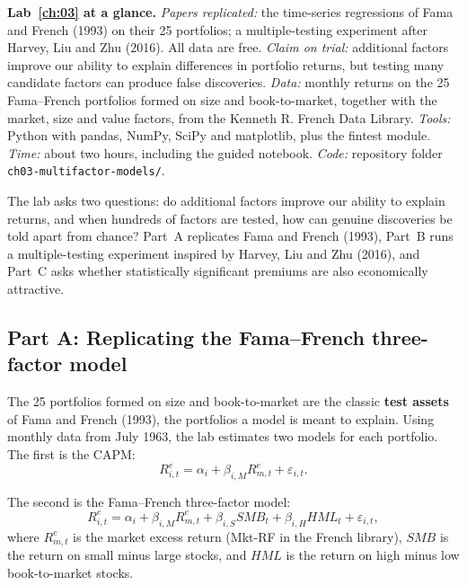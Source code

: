 \begin{callout}
\textbf{Lab~\ref{ch:03} at a glance.} \emph{Papers replicated:} the time-series regressions of Fama and French (1993) on their 25 portfolios; a multiple-testing experiment after Harvey, Liu and Zhu (2016). All data are free. \emph{Claim on trial:} additional factors improve our ability to explain differences in portfolio returns, but testing many candidate factors can produce false discoveries. \emph{Data:} monthly returns on the 25 Fama--French portfolios formed on size and book-to-market, together with the market, size and value factors, from the Kenneth R. French Data Library. \emph{Tools:} Python with pandas, NumPy, SciPy and matplotlib, plus the fintest module. \emph{Time:} about two hours, including the guided notebook. \emph{Code:} repository folder \texttt{ch03-multifactor-models/}.
\end{callout}

The lab asks two questions: do additional factors improve our ability to explain returns, and when hundreds of factors are tested, how can genuine discoveries be told apart from chance? Part~A replicates Fama and French (1993), Part~B runs a multiple-testing experiment inspired by Harvey, Liu and Zhu (2016), and Part~C asks whether statistically significant premiums are also economically attractive.

\subsection*{Part A: Replicating the Fama--French three-factor model}

The 25 portfolios formed on size and book-to-market are the classic \textbf{test assets} of Fama and French (1993), the portfolios a model is meant to explain. Using monthly data from July 1963, the lab estimates two models for each portfolio. The first is the CAPM:
\begin{equation}
  R^{e}_{i,t}
  = \alpha_i+\beta_{i,M}R^{e}_{m,t}+\varepsilon_{i,t}.
  \label{eq:04-lab-capm}
\end{equation}

The second is the Fama--French three-factor model:
\begin{equation}
  R^{e}_{i,t}
  = \alpha_i+\beta_{i,M}R^{e}_{m,t}
  +\beta_{i,S}SMB_t
  +\beta_{i,H}HML_t+\varepsilon_{i,t},
  \label{eq:04-lab-ff3}
\end{equation}
where $R^{e}_{m,t}$ is the market excess return (Mkt-RF in the French library), $SMB$ is the return on small minus large stocks, and $HML$ is the return on high minus low book-to-market stocks.

